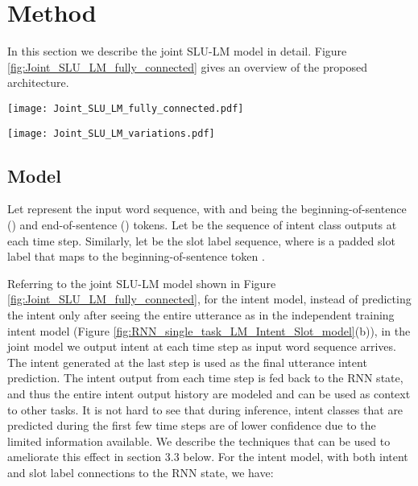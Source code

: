 \documentclass[11pt]{article}
\begin{document}
\section{Method}
    In this section we describe the joint SLU-LM model in detail. Figure \ref{fig:Joint_SLU_LM_fully_connected} gives an overview of the proposed architecture.
        \begin{figure*}[t]
            \centering
            \texttt{[image: Joint\_SLU\_LM\_fully\_connected.pdf]}
            \caption{{Proposed joint online RNN model for intent detection, slot filling, and next word prediction. }}
            \label{fig:Joint_SLU_LM_fully_connected}
        \end{figure*}
        \begin{figure*}[t]
            \centering
            \texttt{[image: Joint\_SLU\_LM\_variations.pdf]}
            \caption{{Joint online SLU-LM model variations. (a) Basic joint model with no conditional dependencies on emitted intent classes and slot labels. (b) Joint model with local intent context. Next word prediction is conditioned on the current step intent class. (c) Joint model with recurrent intent context. The entire intent prediction history and variations are captured in the RNN state. (d) Joint model with both local and recurrent intent context. }}
            \label{fig:Joint_SLU_LM_variations}
        \end{figure*}
    
\subsection{Model}
    Let  represent the input word sequence, with  and  being the beginning-of-sentence () and end-of-sentence () tokens. Let  be the sequence of intent class outputs at each time step. Similarly, let  be the slot label sequence, where  is a padded slot label that maps to the beginning-of-sentence token .
    
    Referring to the joint SLU-LM model shown in Figure \ref{fig:Joint_SLU_LM_fully_connected}, for the intent model, instead of predicting the intent only after seeing the entire utterance as in the independent training intent model (Figure \ref{fig:RNN_single_task_LM_Intent_Slot_model}(b)), in the joint model we output intent at each time step as input word sequence arrives. The intent generated at the last step is used as the final utterance intent prediction. The intent output from each time step is fed back to the RNN state, and thus the entire intent output history are modeled and can be used as context to other tasks. It is not hard to see that during inference, intent classes that are predicted during the first few time steps are of lower confidence due to the limited information available. We describe the techniques that can be used to ameliorate this effect in section 3.3 below. For the intent model, with both intent and slot label connections to the RNN state, we have:
        
\end{document}
